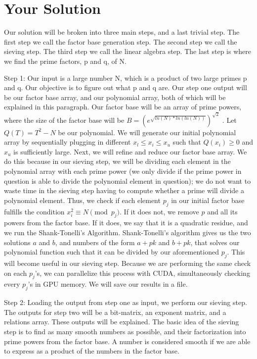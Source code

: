 \documentclass[11pt,twocolumn]{article}
\begin{document}
\section {Your Solution}\label{soln}
Our solution will be broken into three main steps, and a last trivial step. The first step we call the factor base generation step. The second step we call the sieving step. The third step we call the linear algebra step. The last step is where we find the prime factors, p and q, of N.

Step 1: Our input is a large number N, which is a product of two large primes p and q. Our objective is to figure out what p and q are. Our step one output will be our factor base array, and our polynomial array, both of which will be explained in this paragraph. Our factor base will be an array of prime powers, where the size of the factor base will be $B = (e^{\sqrt{ln(N)*ln(ln(N))}})^{\sqrt{2}}$ \cite{hoffstein:cryptography}.
Let $Q(T) = T^2 - N$ be our polynomial. We will generate our initial polynomial array by sequentially plugging in different $x_l \leq x_i \leq x_u$ such that $Q(x_i) \geq 0$ and $x_u$ is sufficiently large. Next, we will refine and
reduce our factor base array. We do this because in our sieving step, we will be dividing each element in the polynomial array with each prime power (we only divide if the prime power in question is able to divide the polynomial element in question); we do not want to waste time in the sieving step having to compute  whether a prime will divide a polynomial element. Thus, we check if each element $p_j$ in our initial factor base fulfills the condition $x_i^2 \equiv N \pmod{p_j}$. If it does not, we remove $p$ and all its powers from the factor base. If it does, we say that it is a quadratic residue, and we run the Shank-Tonelli's Algorithm. Shank-Tonelli's algorithm gives us the two solutions $a$ and $b$, and numbers of the form $a+pk$ and $b+pk$, that solves our polynomial function such that it can be divided by our aforementioned $p_j$. This will become useful in our sieving step. Because we are performing the same check on each $p_j$'s, we can parallelize this process with CUDA, simultaneously checking every $p_j$'s in GPU memory. We will save our results in a file.


Step 2: Loading the output from step one as input, we perform our sieving step. The outputs for step two will be a bit-matrix, an exponent matrix, and a relations array. These outputs will be explained. The basic idea of the sieving step is to find as many smooth numbers as possible, and their factorization into prime powers from the factor base. A number is considered smooth if we are able to express as a product of the numbers in the factor base.
\end{document}
